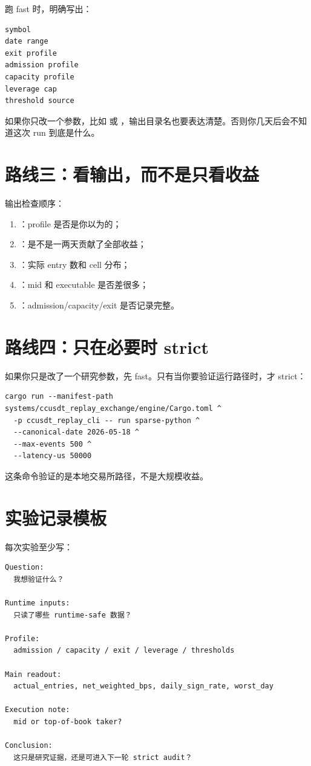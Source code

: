 跑 fast 时，明确写出：

\begin{lstlisting}
symbol
date range
exit profile
admission profile
capacity profile
leverage cap
threshold source
\end{lstlisting}

如果你只改一个参数，比如  或 ，输出目录名也要表达清楚。否则你几天后会不知道这次 run 到底是什么。

\section{路线三：看输出，而不是只看收益}

输出检查顺序：

\begin{enumerate}[leftmargin=2em]
  \item {}：profile 是否是你以为的；
  \item {}：是不是一两天贡献了全部收益；
  \item {}：实际 entry 数和 cell 分布；
  \item {}：mid 和 executable 是否差很多；
  \item {}：admission/capacity/exit 是否记录完整。
\end{enumerate}

\section{路线四：只在必要时 strict}

如果你只是改了一个研究参数，先 fast。只有当你要验证运行路径时，才 strict：

\begin{lstlisting}
cargo run --manifest-path systems/ccusdt_replay_exchange/engine/Cargo.toml ^
  -p ccusdt_replay_cli -- run sparse-python ^
  --canonical-date 2026-05-18 ^
  --max-events 500 ^
  --latency-us 50000
\end{lstlisting}

这条命令验证的是本地交易所路径，不是大规模收益。

\section{实验记录模板}

每次实验至少写：

\begin{lstlisting}
Question:
  我想验证什么？

Runtime inputs:
  只读了哪些 runtime-safe 数据？

Profile:
  admission / capacity / exit / leverage / thresholds

Main readout:
  actual_entries, net_weighted_bps, daily_sign_rate, worst_day

Execution note:
  mid or top-of-book taker?

Conclusion:
  这只是研究证据，还是可进入下一轮 strict audit？
\end{lstlisting}


